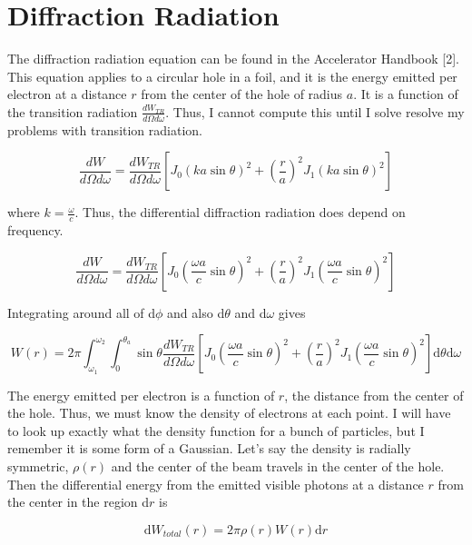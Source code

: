 \documentclass[12pt]{article}
\begin{document}
\section{Diffraction Radiation}

The diffraction radiation equation can be found in the Accelerator Handbook [2]. This equation applies to a circular hole in a foil, and it is the energy emitted per electron at a distance $r$ from the center of the hole of radius $a$. It is a function of the transition radiation $\frac{dW_{TR}} {d \Omega d \omega}$. Thus, I cannot compute this until I solve resolve my problems with transition radiation.

\begin{equation}
\frac{dW} {d \Omega d \omega}=\frac{dW_{TR}} {d \Omega d \omega} [J_{0}(ka \sin \theta)^{2}+(\frac {r}{a})^{2} J_{1}(ka \sin \theta)^{2}]
\end{equation}

where $k=\frac{\omega}{c}$. Thus, the differential diffraction radiation does depend on frequency.

\begin{equation}
\frac{dW} {d \Omega d \omega}=\frac{dW_{TR}} {d \Omega d \omega} [J_{0}(\frac {\omega a}{c} \sin \theta)^{2}+(\frac {r}{a})^{2} J_{1}(\frac {\omega a}{c} \sin \theta)^{2}]
\end{equation}

Integrating around all of d$\phi$ and also d$\theta$ and d$\omega$ gives

\begin{equation}
W(r)= 2 \pi \int_{\omega_{1}}^{\omega_{2}} \int_{0}^{\theta_{a}} \sin \theta \frac{dW_{TR}} {d \Omega d \omega} [J_{0}(\frac {\omega a}{c} \sin \theta)^{2}+(\frac {r}{a})^{2} J_{1}(\frac {\omega a}{c} \sin \theta)^{2}] \mathrm{d} \theta \mathrm{d} \omega
\end{equation}

The energy emitted per electron is a function of $r$, the distance from the center of the hole. Thus, we must know the density of electrons at each point. I will have to look up exactly what the density function for a bunch of particles, but I remember it is some form of a Gaussian. Let's say the density is radially symmetric, $\rho (r)$ and the center of the beam travels in the center of the hole. Then the differential energy from the emitted visible photons at a distance $r$ from the center in the region d$r$ is

\begin{equation}
\mathrm{d}W_{total}(r)=2 \pi \rho (r) W(r) \mathrm{d}r
\end{equation}
\end{document}
